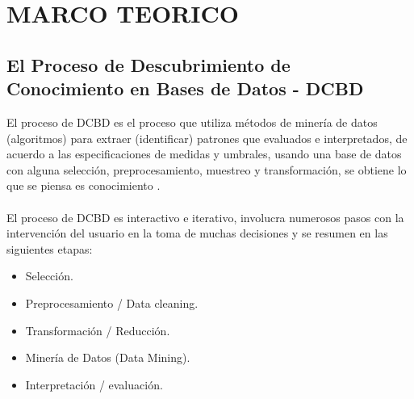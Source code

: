 \chapter{MARCO TEORICO}

\section{El Proceso de Descubrimiento de Conocimiento en Bases de Datos - DCBD}
El proceso de DCBD es el proceso que utiliza m\'etodos de miner\'ia de datos (algoritmos)
para extraer
(identificar) patrones que evaluados e interpretados, de acuerdo a las especificaciones
de medidas y umbrales,
usando una base de datos con alguna selecci\'on, preprocesamiento, muestreo y
transformaci\'on, se obtiene lo que
se piensa es conocimiento \cite{9}.\\
\\
El proceso de DCBD es interactivo e iterativo, involucra numerosos pasos con la
intervenci\'on del usuario en la
toma de muchas decisiones y se resumen en las siguientes etapas:

\begin{itemize}
\item Selecci\'on.
\item Preprocesamiento / Data cleaning.
\item Transformaci\'on / Reducci\'on.
\item Miner\'ia de Datos (Data Mining).
\item Interpretaci\'on / evaluaci\'on.
\end{itemize}

